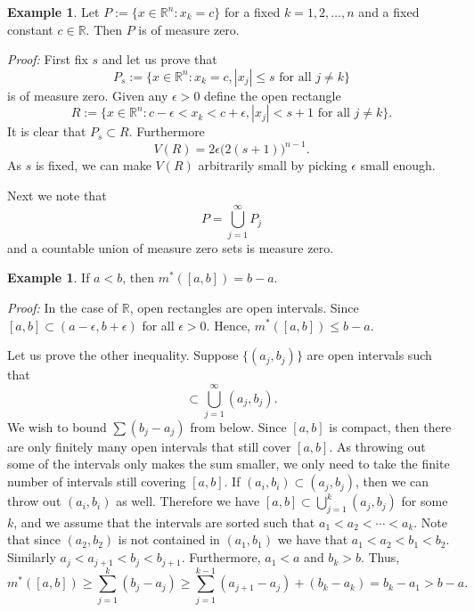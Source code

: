 \documentclass[12pt]{book}
\newcommand{\abs}[1]{\left\lvert {#1} \right\rvert}
\newcommand{\R}{{\mathbb{R}}}
\theoremstyle{plain}
\theoremstyle{remark}
\theoremstyle{definition}
\theoremstyle{exercise}
\theoremstyle{example}
\newtheorem{example}[thm]{Example}
\begin{document}
\begin{example} \label{mv:example:planenull}
Let $P := \{ x \in \R^n : x_k = c \}$ for a fixed $k=1,2,\ldots,n$ and
a fixed constant $c \in \R$.  Then $P$ is of measure zero.

\emph{Proof:}
First fix $s$ and let us prove that
\begin{equation*}
P_s := \{ x \in \R^n : x_k = c, \abs{x_j} \leq s \text{ for all $j\not=k$} \}
\end{equation*}
is of measure zero.
Given any $\epsilon > 0$ define the open rectangle
\begin{equation*}
R := \{ x \in \R^n : c-\epsilon < x_k < c+\epsilon, \abs{x_j} < s+1
\text{ for all $j\not=k$} \} .
\end{equation*}
It is clear that $P_s \subset R$.  Furthermore
\begin{equation*}
V(R) = 2\epsilon {\bigl(2(s+1)\bigr)}^{n-1} .
\end{equation*}
As $s$ is fixed, we can
make $V(R)$
arbitrarily small by
picking $\epsilon$ small enough.

Next we note that
\begin{equation*}
P = \bigcup_{j=1}^\infty P_j
\end{equation*}
and a countable union of measure zero sets is measure zero.
\end{example}

\begin{example}
If $a < b$, then $m^*([a,b]) = b-a$.

\emph{Proof:}
In the case of $\R$, open rectangles are open intervals.
Since $[a,b] \subset (a-\epsilon,b+\epsilon)$ for all $\epsilon > 0$.
Hence, $m^*([a,b]) \leq b-a$.

Let us prove the other inequality.
Suppose $\{ (a_j,b_j) \}$ are open intervals such that
\begin{equation*}
[a,b] \subset \bigcup_{j=1}^\infty (a_j,b_j) .
\end{equation*}
We wish to bound $\sum (b_j-a_j)$ from below.
Since $[a,b]$ is compact, then there are only finitely many open intervals
that still cover $[a,b]$.  As throwing out some of the intervals only makes the
sum smaller, we only need to take the finite number of intervals
still covering $[a,b]$.
If $(a_i,b_i) \subset (a_j,b_j)$, then we can throw out
$(a_i,b_i)$ as well.
Therefore we have
$[a,b] \subset \bigcup_{j=1}^k (a_j,b_j)$ for some $k$, and
we assume that the intervals are sorted such that $a_1 < a_2 < \cdots <
a_k$.  Note that since $(a_2,b_2)$ is not contained in $(a_1,b_1)$
we have that $a_1 < a_2 < b_1 < b_2$.  Similarly
$a_j < a_{j+1} < b_j < b_{j+1}$.  Furthermore, $a_1 < a$ and $b_k > b$.
Thus,
\begin{equation*}
m^*([a,b]) \geq
\sum_{j=1}^k (b_j-a_j)
\geq
\sum_{j=1}^{k-1} (a_{j+1}-a_j)
+
(b_k-a_k)
=
b_k-a_1 > b-a .
\end{equation*}
\end{example}
\end{document}
